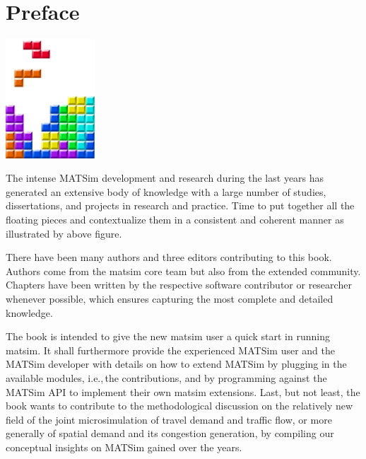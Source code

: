 \chapter*{Preface}

\begin{center} \includegraphics[width=0.25\textwidth, angle=0]{figures/MATSimBook.png} \end{center}

The intense MATSim development and research during the last years has generated an extensive body of knowledge with a large number of studies, dissertations, and projects in research and practice. Time to put together all the floating pieces and contextualize them in a consistent and coherent manner as illustrated by above figure. 

There have been many authors and three editors contributing to this book. Authors come from the \gls{matsim} core team but also from the extended community. Chapters have been written by the respective software contributor or researcher whenever possible, which ensures capturing the most complete and detailed knowledge.

The book is intended to give the new \gls{matsim} user a quick start in running \gls{matsim}. It shall furthermore provide the experienced MATSim user and the MATSim developer with details on how to extend MATSim by plugging in the available modules, i.e.,\,the \glspl{contribution}, and by programming against the MATSim API to implement their own \gls{matsim} \glspl{extension}. Last, but not least, the book wants to contribute to the methodological discussion on the relatively new field of the joint microsimulation of travel demand and traffic flow, or more generally of spatial demand and its congestion generation, by compiling our conceptual insights on MATSim gained over the years.

